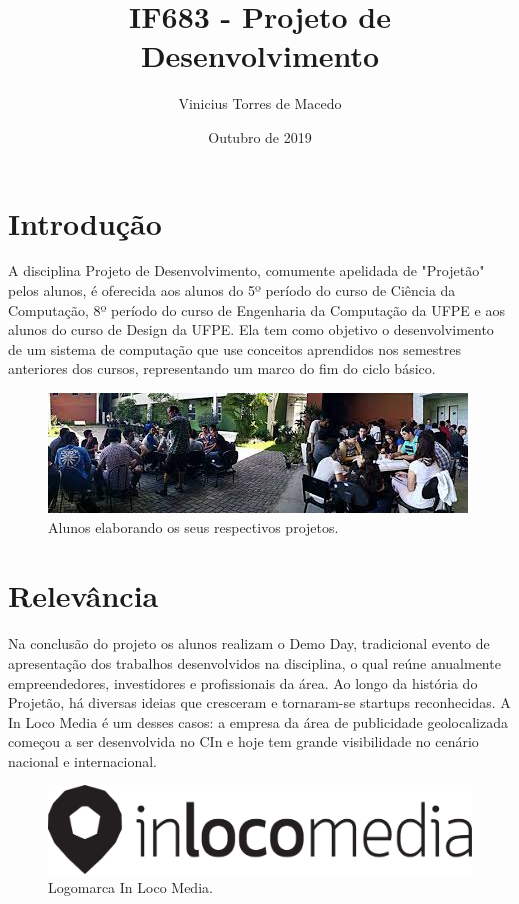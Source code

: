 \documentclass{article}
\title{IF683 - Projeto de Desenvolvimento}
\author{Vinicius Torres de Macedo}
\date{Outubro de 2019}
\begin{document}
\maketitle

\section{Introdução}
 A disciplina Projeto de Desenvolvimento, comumente apelidada de "Projetão" pelos alunos, é oferecida aos alunos do 5º período do curso de Ciência da Computação, 8º período do curso de Engenharia da Computação da UFPE e aos alunos do curso de Design da UFPE. Ela tem como objetivo o desenvolvimento de um sistema de computação que use conceitos aprendidos nos semestres anteriores dos cursos, representando um marco do fim do ciclo básico.\citep{Site1}

\begin{figure}[h!]
\centering
\includegraphics[scale=0.82]{alunosnopatio}
\caption{Alunos elaborando os seus respectivos projetos. \cite{imagem1}}
\end{figure}

\section{Relevância}
Na conclusão do projeto os alunos realizam o Demo Day, tradicional evento de apresentação dos trabalhos desenvolvidos na disciplina, o qual reúne anualmente empreendedores, investidores e profissionais da área. Ao longo da história do Projetão, há diversas ideias que cresceram e tornaram-se startups reconhecidas. A In Loco Media é um desses casos: a empresa da área de publicidade geolocalizada começou a ser desenvolvida no CIn e hoje tem grande visibilidade no cenário nacional e internacional.\cite{Site2}

\begin{figure}[h!]
\centering
\includegraphics[scale=0.82]{inloco}
\caption{Logomarca In Loco Media. \cite{imagem2}}
\end{figure}
\end{document}
